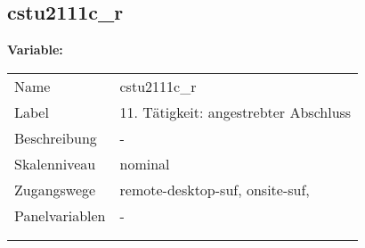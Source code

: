 	
	
	\subsection{cstu2111c\_r}
	\label{subSection:cstu2111c_r}

	\noindent\textbf{Variable:}\\
		\begin{tabular}{lL{11.3cm}}
			\label{tableVariable:cstu2111c_r}
			Name & cstu2111c\_r \\
			Label & 11. Tätigkeit: angestrebter Abschluss \\
			Beschreibung & - \\
			Skalenniveau & nominal \\
			Zugangswege &
				remote-desktop-suf,
				onsite-suf,
 \\
			Panelvariablen & -
			 \\
			 \\
 \\
		\end{tabular}






